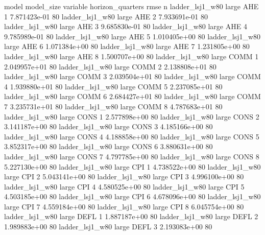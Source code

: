               model model_size variable  horizon_quarters         rmse  n
    ladder_lsj1_w80      large      AHE                 1 7.871423e-01 80
    ladder_lsj1_w80      large      AHE                 2 7.933691e-01 80
    ladder_lsj1_w80      large      AHE                 3 9.685830e-01 80
    ladder_lsj1_w80      large      AHE                 4 9.785989e-01 80
    ladder_lsj1_w80      large      AHE                 5 1.010405e+00 80
    ladder_lsj1_w80      large      AHE                 6 1.071384e+00 80
    ladder_lsj1_w80      large      AHE                 7 1.231805e+00 80
    ladder_lsj1_w80      large      AHE                 8 1.500707e+00 80
    ladder_lsj1_w80      large     COMM                 1 2.049957e+01 80
    ladder_lsj1_w80      large     COMM                 2 2.138808e+01 80
    ladder_lsj1_w80      large     COMM                 3 2.039504e+01 80
    ladder_lsj1_w80      large     COMM                 4 1.939880e+01 80
    ladder_lsj1_w80      large     COMM                 5 2.237085e+01 80
    ladder_lsj1_w80      large     COMM                 6 2.684427e+01 80
    ladder_lsj1_w80      large     COMM                 7 3.235731e+01 80
    ladder_lsj1_w80      large     COMM                 8 4.787683e+01 80
    ladder_lsj1_w80      large     CONS                 1 2.577898e+00 80
    ladder_lsj1_w80      large     CONS                 2 3.141187e+00 80
    ladder_lsj1_w80      large     CONS                 3 4.185166e+00 80
    ladder_lsj1_w80      large     CONS                 4 4.188858e+00 80
    ladder_lsj1_w80      large     CONS                 5 3.852317e+00 80
    ladder_lsj1_w80      large     CONS                 6 3.880631e+00 80
    ladder_lsj1_w80      large     CONS                 7 4.797785e+00 80
    ladder_lsj1_w80      large     CONS                 8 5.227130e+00 80
    ladder_lsj1_w80      large      CPI                 1 4.738522e+00 80
    ladder_lsj1_w80      large      CPI                 2 5.043141e+00 80
    ladder_lsj1_w80      large      CPI                 3 4.996100e+00 80
    ladder_lsj1_w80      large      CPI                 4 4.580525e+00 80
    ladder_lsj1_w80      large      CPI                 5 4.503185e+00 80
    ladder_lsj1_w80      large      CPI                 6 4.678096e+00 80
    ladder_lsj1_w80      large      CPI                 7 4.559184e+00 80
    ladder_lsj1_w80      large      CPI                 8 6.045754e+00 80
    ladder_lsj1_w80      large     DEFL                 1 1.887187e+00 80
    ladder_lsj1_w80      large     DEFL                 2 1.989883e+00 80
    ladder_lsj1_w80      large     DEFL                 3 2.193083e+00 80
